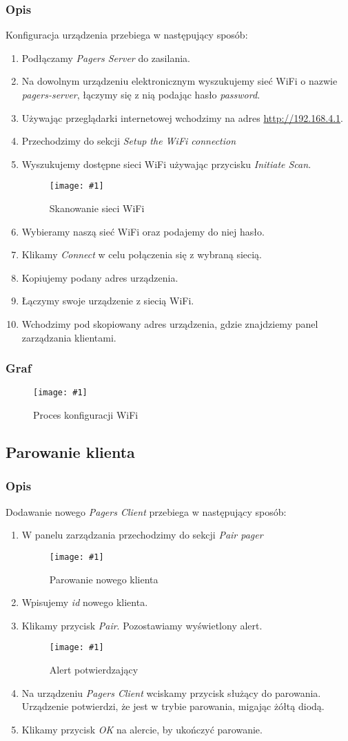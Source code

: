 \documentclass[12pt]{article}
\newcommand{\imgcustomsize}[3]{
	\begin{figure}[H]
		\centering
		\texttt{[image: \#1]}
		\caption{#2}
	\end{figure}
}
\newcommand{\img}[2]{\imgcustomsize{#1}{#2}{0.8}}
\begin{document}
        \subsubsection{Opis}
        Konfiguracja urządzenia przebiega w następujący sposób:
        \begin{enumerate}
            \item Podłączamy \emph{Pagers Server} do zasilania.
            \item Na dowolnym urządzeniu elektronicznym wyszukujemy sieć WiFi o nazwie \mbox{\emph{pagers-server}}, łączymy się z nią podając hasło \mbox{\emph{password}}.
            \item Używając przeglądarki internetowej wchodzimy na adres \url{http://192.168.4.1}.
            \item Przechodzimy do sekcji \emph{Setup the WiFi connection}
            \item Wyszukujemy dostępne sieci WiFi używając przycisku \emph{Initiate Scan}.
            \img{config/scan_init}{Skanowanie sieci WiFi}
            \item Wybieramy naszą sieć WiFi oraz podajemy do niej hasło.
            \item Klikamy \emph{Connect} w celu połączenia się z wybraną siecią.
            \item Kopiujemy podany adres urządzenia.
            \item Łączymy swoje urządzenie z siecią WiFi.
            \item Wchodzimy pod skopiowany adres urządzenia, gdzie znajdziemy panel zarządzania klientami.
        \end{enumerate}
        \subsubsection{Graf}
        \img{graphs/wifi_setup}{Proces konfiguracji WiFi}
        \pagebreak
        \subsection{Parowanie klienta}
        \subsubsection{Opis}
        Dodawanie nowego \emph{Pagers Client} przebiega w następujący sposób:
        \begin{enumerate}
            \item W panelu zarządzania przechodzimy do sekcji \emph{Pair pager}
            \img{config/pagers_pair}{Parowanie nowego klienta}
            \item Wpisujemy \emph{id} nowego klienta.
            \item Klikamy przycisk \emph{Pair}. Pozostawiamy wyświetlony alert.
            \img{config/pair_alert}{Alert potwierdzający}
            \item Na urządzeniu \emph{Pagers Client} wciskamy przycisk służący do parowania. Urządzenie potwierdzi, że jest w trybie parowania, migając żółtą diodą.
            \item Klikamy przycisk \emph{OK} na alercie, by ukończyć parowanie.
        \end{enumerate}
\end{document}
